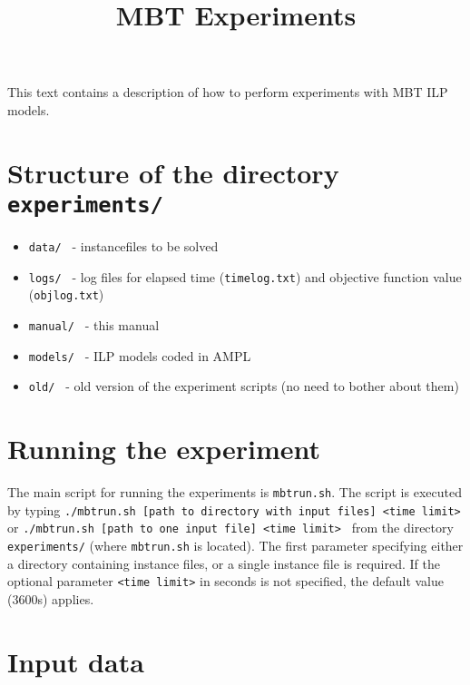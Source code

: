 \documentclass[12pt]{article}
\title{MBT Experiments}
\begin{document}
\maketitle
This text contains a description of how to perform experiments with MBT ILP models.

\section{Structure of the directory \texttt{experiments/}}
\begin{itemize}
	\item\texttt{data/ } - instancefiles to be solved
	\item\texttt{logs/ } - log files for elapsed time (\texttt{timelog.txt}) and objective function value (\texttt{objlog.txt})
	\item\texttt{manual/ } - this manual
	\item\texttt{models/ } - ILP models coded in AMPL
	\item\texttt{old/ } - old version of the experiment scripts (no need to bother about them)
\end{itemize}

\section{Running the experiment}

The main script for running the experiments is \texttt{mbtrun.sh}.
The script is executed by typing \newline\newline
\texttt{./mbtrun.sh [path to directory with input files] <time limit> }\newline\newline
or\newline\newline 
\texttt{./mbtrun.sh [path to one input file] <time limit> }\newline\newline
from the directory \texttt{experiments/} (where \texttt{mbtrun.sh} is located).
The first parameter specifying either a directory containing instance files, or a single instance file is required.
If the optional parameter \texttt{<time limit>} in seconds is not specified, the default value (3600s) applies.

\section{Input data}
\end{document}
